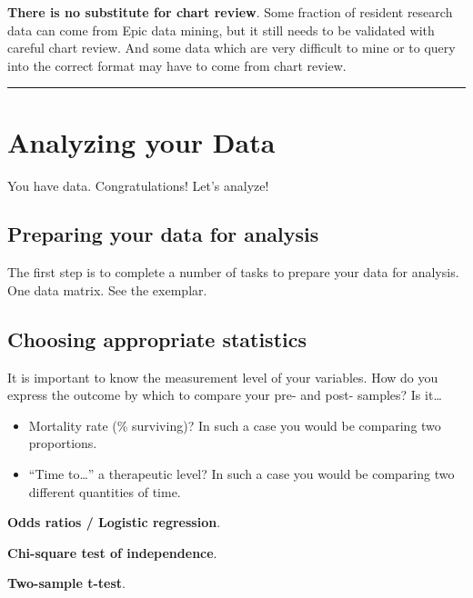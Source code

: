 \documentclass[
]{report}
\providecommand{\tightlist}{%
  \setlength{\itemsep}{0pt}\setlength{\parskip}{0pt}}
\begin{document}
\textbf{There is no substitute for chart review}. Some fraction of
resident research data can come from Epic data mining, but it still
needs to be validated with careful chart review. And some data which are
very difficult to mine or to query into the correct format may have to
come from chart review.

\begin{center}\rule{0.5\linewidth}{0.5pt}\end{center}

\hypertarget{analyzing-your-data}{%
\chapter{Analyzing your Data}\label{analyzing-your-data}}

You have data. Congratulations! Let's analyze!

\hypertarget{preparing-your-data-for-analysis}{%
\section{Preparing your data for
analysis}\label{preparing-your-data-for-analysis}}

The first step is to complete a number of tasks to prepare your data for
analysis. One data matrix. See the exemplar.

\hypertarget{choosing-appropriate-statistics}{%
\section{Choosing appropriate
statistics}\label{choosing-appropriate-statistics}}

It is important to know the measurement level of your variables. How do
you express the outcome by which to compare your pre- and post- samples?
Is it\ldots{}

\begin{itemize}
\tightlist
\item
  Mortality rate (\% surviving)? In such a case you would be comparing
  two proportions.
\item
  ``Time to\ldots{}'' a therapeutic level? In such a case you would be
  comparing two different quantities of time.
\end{itemize}

\textbf{Odds ratios / Logistic regression}.

\textbf{Chi-square test of independence}.

\textbf{Two-sample t-test}.
\end{document}

